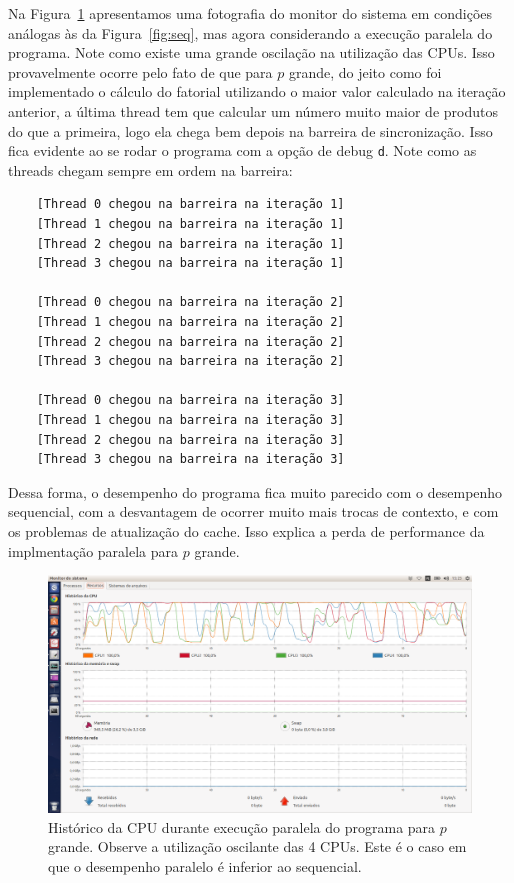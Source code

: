 \documentclass[12pt]{article}
\begin{document}
Na Figura~\ref{fig:par1} apresentamos uma fotografia do monitor do sistema em condições análogas 
às da Figura~\ref{fig:seq}, mas agora considerando a execução paralela do programa. Note como 
existe uma grande oscilação na utilização das CPUs. Isso provavelmente ocorre pelo fato de que para
$p$ grande, do jeito como foi implementado o cálculo do fatorial utilizando o maior valor calculado 
na iteração anterior, a última thread tem que calcular um número muito maior de produtos do que a 
primeira, logo ela chega bem depois na barreira de sincronização. Isso fica evidente ao se rodar o
programa com a opção de debug \verb|d|. Note como as threads chegam sempre em ordem na barreira:

\begin{small}
\begin{verbatim}
	[Thread 0 chegou na barreira na iteração 1]
	[Thread 1 chegou na barreira na iteração 1]	
	[Thread 2 chegou na barreira na iteração 1]
	[Thread 3 chegou na barreira na iteração 1]

	[Thread 0 chegou na barreira na iteração 2]
	[Thread 1 chegou na barreira na iteração 2]
	[Thread 2 chegou na barreira na iteração 2]
	[Thread 3 chegou na barreira na iteração 2]

	[Thread 0 chegou na barreira na iteração 3]
	[Thread 1 chegou na barreira na iteração 3]
	[Thread 2 chegou na barreira na iteração 3]
	[Thread 3 chegou na barreira na iteração 3]
\end{verbatim}
\end{small}

Dessa forma, o desempenho do programa fica muito parecido com o desempenho sequencial, com a 
desvantagem de ocorrer muito mais trocas de contexto, e com os problemas de atualização do cache. 
Isso explica a perda de performance da implmentação paralela para $p$ grande.

\begin{figure}[ht]
	\begin{center}
		\includegraphics[scale=0.275]{paralela1.png}
		\caption{Histórico da CPU durante execução paralela do programa para $p$ grande. Observe a 
		utilização oscilante das 4 CPUs. Este é o caso em que o desempenho paralelo é inferior ao 
		sequencial.}
		\label{fig:par1} 
	\end{center}
\end{figure}
\end{document}
